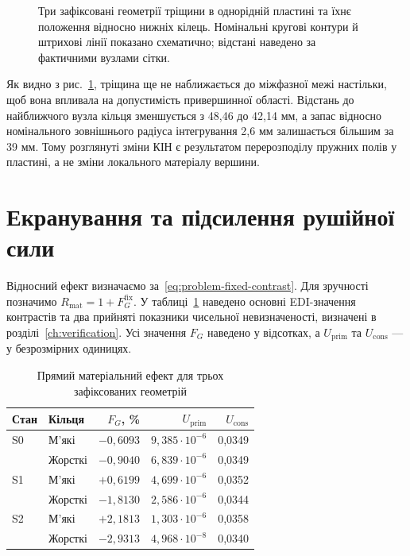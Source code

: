 \begin{figure}[htbp]
 \centering
 
 \caption{Три зафіксовані геометрії тріщини в однорідній пластині та їхнє положення відносно нижніх кілець. Номінальні кругові контури й штрихові лінії показано схематично; відстані наведено за фактичними вузлами сітки.}
 \label{fig:fixed-geometry}
\end{figure}

Як видно з рис.~\ref{fig:fixed-geometry}, тріщина ще не наближається до міжфазної межі настільки, щоб вона впливала на допустимість привершинної області. Відстань до найближчого вузла кільця зменшується з 48,46 до 42,14 мм, а запас відносно номінального зовнішнього радіуса інтегрування 2,6 мм залишається більшим за 39 мм. Тому розглянуті зміни КІН є результатом перерозподілу пружних полів у пластині, а не зміни локального матеріалу вершини.

\section{Екранування та підсилення рушійної сили}
\label{sec:fixed-energy}

Відносний ефект визначаємо за~\eqref{eq:problem-fixed-contrast}. Для зручності позначимо $R_{\mathrm{mat}}=1+F_G^{\mathrm{fix}}$. У таблиці~\ref{tab:fixed-energy} наведено основні EDI-значення контрастів та два прийняті показники чисельної невизначеності, визначені в розділі~\ref{ch:verification}. Усі значення $F_G$ наведено у відсотках, а $U_{\mathrm{prim}}$ та $U_{\mathrm{cons}}$ --- у безрозмірних одиницях.

\begin{table}[htbp]
 \centering
 \caption{Прямий матеріальний ефект для трьох зафіксованих геометрій}
 \label{tab:fixed-energy}
 \begin{tabular}{llrrr}
 \toprule
 Стан & Кільця & $F_G$, \% & $U_{\mathrm{prim}}$ & $U_{\mathrm{cons}}$\\
 \midrule
 S0 & М'які & $-0,6093$ & $9,385\cdot10^{-6}$ & 0,0349\\
    & Жорсткі & $-0,9040$ & $6,839\cdot10^{-6}$ & 0,0349\\
 S1 & М'які & $+0,6199$ & $4,699\cdot10^{-6}$ & 0,0352\\
    & Жорсткі & $-1,8130$ & $2,586\cdot10^{-6}$ & 0,0344\\
 S2 & М'які & $+2,1813$ & $1,303\cdot10^{-6}$ & 0,0358\\
    & Жорсткі & $-2,9313$ & $4,968\cdot10^{-8}$ & 0,0340\\
 \bottomrule
 \end{tabular}
\end{table}

